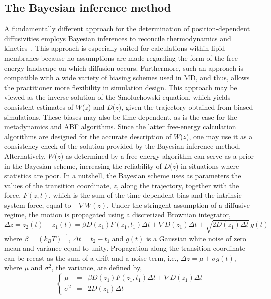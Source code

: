 \subsection{The Bayesian inference method}



A fundamentally different approach for the determination of position-dependent
diffusivities employs Bayesian inferences to reconcile thermodynamics and kinetics~\cite{Hummer2005,Turkcan2012,Comer2013}.  This approach is especially suited for calculations within lipid membranes
because no assumptions are made regarding the form of the free-energy landscape on which diffusion occurs.
Furthermore, such an approach
is compatible with a wide variety of biasing schemes used in MD,
and thus, allows the practitioner more flexibility in simulation design.
This approach may be viewed as the
inverse solution of the Smoluchowski equation, which yields consistent estimates
of $W$($z$) and $D$($z$), given the
trajectory obtained from biased simulations.
These biases may also be time-dependent, as is the case for
the metadynamics and ABF algorithms.
Since the latter free-energy calculation algorithms are
designed for the accurate description of $W$($z$), one may use it as a
consistency check of the solution provided by the Bayesian inference method.
Alternatively, $W$($z$) as determined by a free-energy algorithm can
serve as a prior in the Bayesian scheme, increasing the reliability of
$D$($z$) in situations where statistics are poor.
In a nutshell, the Bayesian scheme uses as parameters the values of
the transition coordinate, $z$, along the trajectory, together with the force, $F(z,t)$,
which is the sum of the time-dependent bias and the intrinsic system force, equal
to $-\nabla W(z)$. Under the stringent assumption of a diffusive regime, the
motion is propagated using a discretized Brownian integrator,
\begin{equation}
\Delta z = z_2(t) - z_1(t) = \beta D(z_1) F(z_1, t_1) \Delta t + \nabla D(z_1) \Delta t + \sqrt{2 D(z_1) \Delta t} \ g(t)
\label{Brownian}
\end{equation}
where $\beta = (k_B T)^{-1}$, $\Delta t = t_2 - t_1$ and $g(t)$
is a Gaussian white noise of zero mean and variance equal to unity. Propagation along the
transition coordinate can be recast as the sum of a drift and a noise
term, i.e., $\Delta z = \mu + \sigma g(t)$, where
$\mu$ and $\sigma^2$, the variance, are defined by,
\begin{equation}
\left\{
\begin{array}{lcl}
\mu      & = & \beta D(z_1) F(z_1, t_1) \Delta t + \nabla D(z_1) \Delta t
\\
\sigma^2 & = & 2 D(z_1) \Delta t
\end{array}
\right.
\end{equation}
